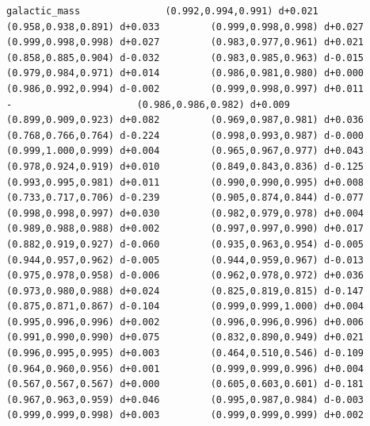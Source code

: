 \documentclass[11pt, letterpaper, openany]{book}
\begin{document}
\begin{empiricalbox}
\begin{lstlisting}[style=terminal]
galactic_mass               (0.992,0.994,0.991) d+0.021         (0.958,0.938,0.891) d+0.033         (0.999,0.998,0.998) d+0.027         (0.999,0.998,0.998) d+0.027         (0.983,0.977,0.961) d+0.021         (0.858,0.885,0.904) d-0.032         (0.983,0.985,0.963) d-0.015         (0.979,0.984,0.971) d+0.014         (0.986,0.981,0.980) d+0.000         (0.986,0.992,0.994) d-0.002         (0.999,0.998,0.997) d+0.011                      -                      (0.986,0.986,0.982) d+0.009         (0.899,0.909,0.923) d+0.082         (0.969,0.987,0.981) d+0.036         (0.768,0.766,0.764) d-0.224         (0.998,0.993,0.987) d-0.000         (0.999,1.000,0.999) d+0.004         (0.965,0.967,0.977) d+0.043         (0.978,0.924,0.919) d+0.010         (0.849,0.843,0.836) d-0.125         (0.993,0.995,0.981) d+0.011         (0.990,0.990,0.995) d+0.008         (0.733,0.717,0.706) d-0.239         (0.905,0.874,0.844) d-0.077         (0.998,0.998,0.997) d+0.030         (0.982,0.979,0.978) d+0.004         (0.989,0.988,0.988) d+0.002         (0.997,0.997,0.990) d+0.017         (0.882,0.919,0.927) d-0.060         (0.935,0.963,0.954) d-0.005         (0.944,0.957,0.962) d-0.005         (0.944,0.959,0.967) d-0.013         (0.975,0.978,0.958) d-0.006         (0.962,0.978,0.972) d+0.036         (0.973,0.980,0.988) d+0.024         (0.825,0.819,0.815) d-0.147         (0.875,0.871,0.867) d-0.104         (0.999,0.999,1.000) d+0.004         (0.995,0.996,0.996) d+0.002         (0.996,0.996,0.996) d+0.006         (0.991,0.990,0.990) d+0.075         (0.832,0.890,0.949) d+0.021         (0.996,0.995,0.995) d+0.003         (0.464,0.510,0.546) d-0.109         (0.964,0.960,0.956) d+0.001         (0.999,0.999,0.996) d+0.004         (0.567,0.567,0.567) d+0.000         (0.605,0.603,0.601) d-0.181         (0.967,0.963,0.959) d+0.046         (0.995,0.987,0.984) d-0.003         (0.999,0.999,0.998) d+0.003         (0.999,0.999,0.999) d+0.002     

\end{lstlisting}
\end{empiricalbox}
\end{document}
